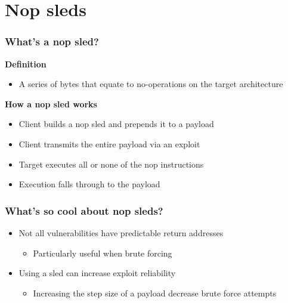 \documentclass{beamer}
\newenvironment{sitemize}{\vspace{1mm}\begin{itemize}\itemsep 4pt\small}{\end{itemize}}
\begin{document}
\section{Nop sleds}

%

\begin{frame}[t]
    \frametitle{What's a nop sled?}

    \textbf{Definition}
    \begin{sitemize}
        \item A series of bytes that equate to no-operations on the
        target architecture
    \end{sitemize}

    \pause
    \textbf{How a nop sled works}
    \begin{sitemize}
        \item<3-> Client builds a nop sled and prepends it to a payload
        \item<4-> Client transmits the entire payload via an exploit
        \item<5-> Target executes all or none of the nop
        instructions
        \item<6-> Execution falls through to the payload
    \end{sitemize}

\end{frame}

\begin{frame}[t]
    \frametitle{What's so cool about nop sleds?}

    \begin{sitemize}
        \item Not all vulnerabilities have predictable return
        addresses
        \begin{sitemize}
            \item Particularly useful when brute forcing
        \end{sitemize}

        \pause
        \item Using a sled can increase exploit reliability
        \begin{sitemize}
            \item Increasing the step size of a payload decrease
            brute force attempts
        \end{sitemize}
    \end{sitemize}
\end{frame}
\end{document}
